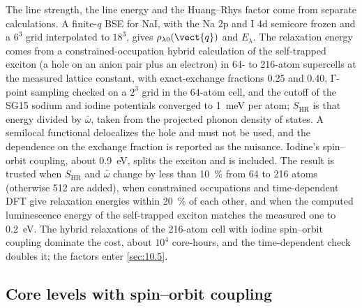 The line strength, the line energy and the Huang--Rhys factor come from separate calculations. A finite-$q$ BSE for NaI, with the Na 2p and I 4d semicore frozen and a $6^3$ grid interpolated to $18^3$, gives $\rho_{\lambda0}(\vect{q})$ and $E_\lambda$. The relaxation energy comes from a constrained-occupation hybrid calculation of the self-trapped exciton (a hole on an anion pair plus an electron) in 64- to 216-atom supercells at the measured lattice constant, with exact-exchange fractions 0.25 and 0.40, $\mathrm{\Gamma}$-point sampling checked on a $2^3$ grid in the 64-atom cell, and the cutoff of the SG15 sodium and iodine potentials converged to \SI{1}{meV} per atom; $S_{\mathrm{HR}}$ is that energy divided by $\bar\omega$, taken from the projected phonon density of states. A semilocal functional delocalizes the hole and must not be used, and the dependence on the exchange fraction is reported as the nuisance. Iodine's spin--orbit coupling, about \SI{0.9}{eV}, splits the exciton and is included. The result is trusted when $S_{\mathrm{HR}}$ and $\bar\omega$ change by less than \SI{10}{\percent} from 64 to 216 atoms (otherwise 512 are added), when constrained occupations and time-dependent DFT give relaxation energies within \SI{20}{\percent} of each other, and when the computed luminescence energy of the self-trapped exciton matches the measured one to \SI{0.2}{eV}. The hybrid relaxations of the 216-atom cell with iodine spin--orbit coupling dominate the cost, about $10^4$ core-hours, and the time-dependent check doubles it; the factors enter \cref{sec:10.5}.

\subsection{Core levels with spin--orbit coupling}

